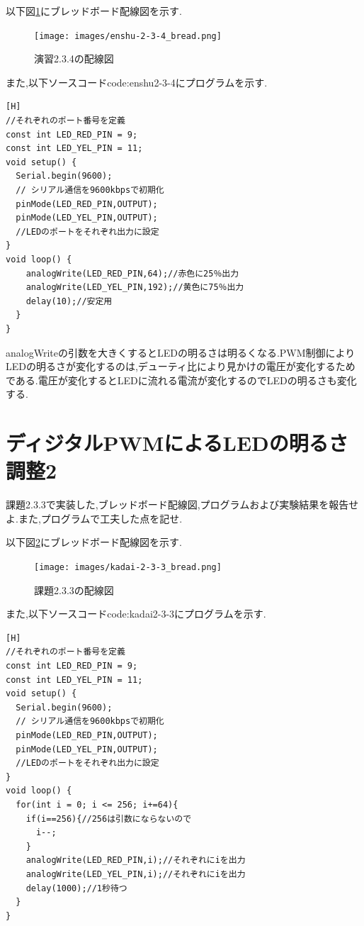\documentclass{jarticle}
\begin{document}
以下図\ref{fig:enshu2-3-4bread}にブレッドボード配線図を示す.

\begin{figure}[H]
\begin{center}
\texttt{[image: images/enshu-2-3-4\_bread.png]}
\caption{演習2.3.4の配線図}
\label{fig:enshu2-3-4bread}
\end{center}
\end{figure}

また,以下ソースコード{code:enshu2-3-4}にプログラムを示す.

\begin{lstlisting}[caption = 演習2.3.4,label=code:enshu2-3-4][H]
//それぞれのポート番号を定義
const int LED_RED_PIN = 9; 
const int LED_YEL_PIN = 11;
void setup() {
  Serial.begin(9600);
  // シリアル通信を9600kbpsで初期化
  pinMode(LED_RED_PIN,OUTPUT);
  pinMode(LED_YEL_PIN,OUTPUT);
  //LEDのポートをそれぞれ出力に設定
}
void loop() {
    analogWrite(LED_RED_PIN,64);//赤色に25％出力
    analogWrite(LED_YEL_PIN,192);//黄色に75％出力
    delay(10);//安定用
  }
}
\end{lstlisting}

analogWriteの引数を大きくするとLEDの明るさは明るくなる.PWM制御によりLEDの明るさが変化するのは,デューティ比により見かけの電圧が変化するためである.電圧が変化するとLEDに流れる電流が変化するのでLEDの明るさも変化する.

\section{ディジタルPWMによるLEDの明るさ調整2}

課題2.3.3で実装した,ブレッドボード配線図,プログラムおよび実験結果を報告せよ.また,プログラムで工夫した点を記せ.


以下図\ref{fig:kadai2-3-3bread}にブレッドボード配線図を示す.

\begin{figure}[H]
\begin{center}
\texttt{[image: images/kadai-2-3-3\_bread.png]}
\caption{課題2.3.3の配線図}
\label{fig:kadai2-3-3bread}
\end{center}
\end{figure}

また,以下ソースコード{code:kadai2-3-3}にプログラムを示す.

\begin{lstlisting}[caption = 課題2.3.3,label=code:kadai2-3-3][H]
//それぞれのポート番号を定義
const int LED_RED_PIN = 9;
const int LED_YEL_PIN = 11;
void setup() {
  Serial.begin(9600);
  // シリアル通信を9600kbpsで初期化
  pinMode(LED_RED_PIN,OUTPUT);
  pinMode(LED_YEL_PIN,OUTPUT);
  //LEDのポートをそれぞれ出力に設定
}
void loop() {
  for(int i = 0; i <= 256; i+=64){
    if(i==256){//256は引数にならないので
      i--;
    }
    analogWrite(LED_RED_PIN,i);//それぞれにiを出力
    analogWrite(LED_YEL_PIN,i);//それぞれにiを出力
    delay(1000);//1秒待つ
  }
}
\end{lstlisting}
\end{document}

